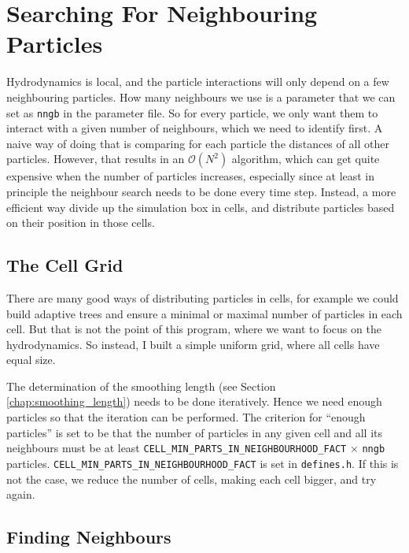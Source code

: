 \newpage
\section{Searching For Neighbouring Particles}\label{chap:neighboursearch}



Hydrodynamics is local, and the particle interactions will only depend on a few neighbouring particles.
How many neighbours we use is a parameter that we can set as \texttt{nngb} in the parameter file.
So for every particle, we only want them to interact with a given number of neighbours, which we need to identify first.
A naive way of doing that is comparing for each particle the distances of all other particles.
However, that results in an $\mathcal{O}(N^2)$ algorithm, which can get quite expensive when the number of particles increases, especially since at least in principle the neighbour search needs to be done every time step.
Instead, a more efficient way divide up the simulation box in cells, and distribute particles based on their position in those cells.









\subsection{The Cell Grid}

There are many good ways of distributing particles in cells, for example we could build adaptive trees and ensure a minimal or maximal number of particles in each cell.
But that is not the point of this program, where we want to focus on the hydrodynamics.
So instead, I built a simple uniform grid, where all cells have equal size.

The determination of the smoothing length (see Section \ref{chap:smoothing_length}) needs to be done iteratively.
Hence we need enough particles so that the iteration can be performed.
The criterion for ``enough particles'' is set to be that the number of particles in any given cell and all its neighbours must be at least \texttt{CELL_MIN_PARTS_IN_NEIGHBOURHOOD_FACT} $\times$ \texttt{nngb} particles.
\texttt{CELL_MIN_PARTS_IN_NEIGHBOURHOOD_FACT} is set in \texttt{defines.h}.
If this is not the case, we reduce the number of cells, making each cell bigger, and try again.







\subsection{Finding Neighbours}


